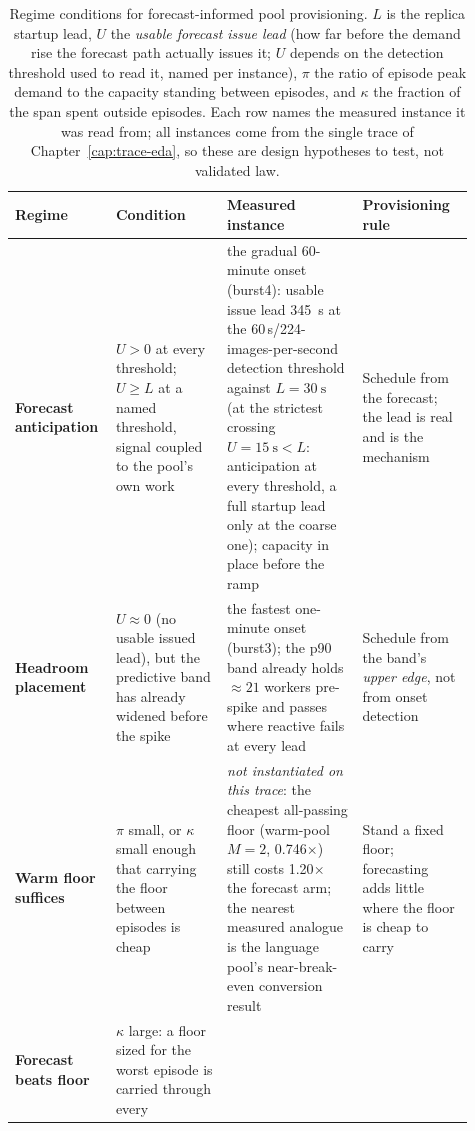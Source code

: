 \begin{table}[htbp]
\centering
\caption[Regime conditions for forecast-informed pool
provisioning]{Regime conditions for forecast-informed pool provisioning.
$L$ is the replica startup lead, $U$ the \emph{usable forecast issue lead}
(how far before the demand rise the forecast path actually issues it; $U$
depends on the detection threshold used to read it, named per instance),
$\pi$ the ratio of episode peak demand to the capacity standing between
episodes, and $\kappa$ the fraction of the span spent outside episodes. Each row names the
measured instance it was read from; all instances come from the single trace
of Chapter~\ref{cap:trace-eda}, so these are design hypotheses to test, not
validated law.}
\label{tab:conc-regimes}
\footnotesize
\setlength{\tabcolsep}{4pt}
\begin{tabular}{@{}p{0.155\linewidth}p{0.235\linewidth}p{0.29\linewidth}p{0.235\linewidth}@{}}
\toprule
Regime & Condition & Measured instance & Provisioning rule \\
\midrule
\textbf{Forecast anticipation} &
$U > 0$ at every threshold; $U \geq L$ at a named threshold, signal coupled
to the pool's own work &
the gradual 60-minute onset (burst4): usable issue lead \SI{345}{\second} at the 60\,s/224-images-per-second
detection threshold against $L{=}\SI{30}{\second}$ (at the strictest
crossing $U{=}\SI{15}{\second} < L$: anticipation at every threshold, a
full startup lead only at the coarse one); capacity in place before the ramp &
Schedule from the forecast; the lead is real and is the mechanism \\
\addlinespace
\textbf{Headroom placement} &
$U \approx 0$ (no usable issued lead), but the predictive band has already
widened before the spike &
the fastest one-minute onset (burst3); the p90 band already holds ${\approx}21$ workers
pre-spike and passes where reactive fails at every lead &
Schedule from the band's \emph{upper edge}, not from onset detection \\
\addlinespace
\textbf{Warm floor suffices} &
$\pi$ small, or $\kappa$ small enough that carrying the floor between
episodes is cheap &
\emph{not instantiated on this trace}: the cheapest all-passing floor
(warm-pool $M{=}2$, 0.746$\times$) still costs 1.20$\times$ the forecast
arm; the nearest measured analogue is the language pool's near-break-even
conversion result &
Stand a fixed floor; forecasting adds little where the floor is cheap to
carry \\
\addlinespace
\textbf{Forecast beats floor} &
$\kappa$ large: a floor sized for the worst episode is carried through every

\end{tabular}
\end{table}
